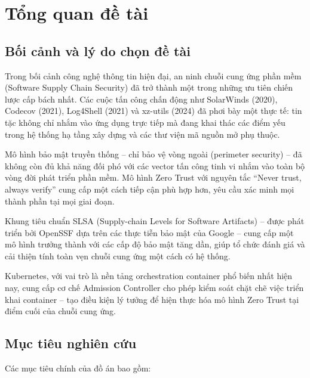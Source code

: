 \chapter{Tổng quan đề tài}\label{ch:introduction}

\section{Bối cảnh và lý do chọn đề tài}

Trong bối cảnh công nghệ thông tin hiện đại, an ninh chuỗi cung ứng phần mềm (Software Supply Chain Security) đã trở thành một trong những ưu tiên chiến lược cấp bách nhất. Các cuộc tấn công chấn động như SolarWinds (2020), Codecov (2021), Log4Shell (2021) và xz-utils (2024) đã phơi bày một thực tế: tin tặc không chỉ nhắm vào ứng dụng trực tiếp mà đang khai thác các điểm yếu trong hệ thống hạ tầng xây dựng và các thư viện mã nguồn mở phụ thuộc.

Mô hình bảo mật truyền thống -- chỉ bảo vệ vòng ngoài (perimeter security) -- đã không còn đủ khả năng đối phó với các vector tấn công tinh vi nhắm vào toàn bộ vòng đời phát triển phần mềm. Mô hình Zero Trust với nguyên tắc ``Never trust, always verify'' cung cấp một cách tiếp cận phù hợp hơn, yêu cầu xác minh mọi thành phần tại mọi giai đoạn.

Khung tiêu chuẩn SLSA (Supply-chain Levels for Software Artifacts) -- được phát triển bởi OpenSSF dựa trên các thực tiễn bảo mật của Google -- cung cấp một mô hình trưởng thành với các cấp độ bảo mật tăng dần, giúp tổ chức đánh giá và cải thiện tính toàn vẹn chuỗi cung ứng một cách có hệ thống.

Kubernetes, với vai trò là nền tảng orchestration container phổ biến nhất hiện nay, cung cấp cơ chế Admission Controller cho phép kiểm soát chặt chẽ việc triển khai container -- tạo điều kiện lý tưởng để hiện thực hóa mô hình Zero Trust tại điểm cuối của chuỗi cung ứng.


\section{Mục tiêu nghiên cứu}

Các mục tiêu chính của đồ án bao gồm:

